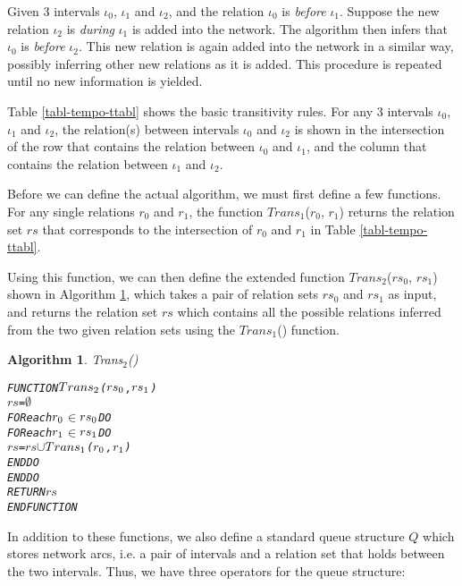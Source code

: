 \documentclass[11pt]{report}
\newenvironment{vverbatim}
{
  \begin{alltt}
}
{
    \vspace{-\baselineskip}
  \end{alltt}
}
\newtheorem{vvalgorithm}{Algorithm}[chapter]
\newenvironment{valgorithm}[2]
{
  \begin{vvalgorithm}{#1}
    \label{#2}
    \small
    \begin{vverbatim}
}
{
    \end{vverbatim}
  \end{vvalgorithm}
}
\begin{document}
          Given 3 intervals $\iota_0$, $\iota_1$ and $\iota_2$, and the
          relation $\iota_0$ is {\em before} $\iota_1$. Suppose the new
          relation $\iota_2$ is {\em during} $\iota_1$ is added into the
          network. The algorithm then infers that $\iota_0$ is {\em before}
          $\iota_2$. This new relation is again added into the network in a
          similar way, possibly inferring other new relations as it is added.
          This procedure is repeated until no new information is yielded.

          Table \ref{tabl-tempo-ttabl} shows the basic transitivity rules. For
          any 3 intervals $\iota_0$, $\iota_1$ and $\iota_2$, the relation(s)
          between intervals $\iota_0$ and $\iota_2$ is shown in the
          intersection of the row that contains the relation between $\iota_0$
          and $\iota_1$, and the column that contains the relation between
          $\iota_1$ and $\iota_2$.

          Before we can define the actual algorithm, we must first define a few
          functions. For any single relations $r_0$ and $r_1$, the function
          $Trans_1$($r_0$, $r_1$) returns the relation set $rs$ that
          corresponds to the intersection of $r_0$ and $r_1$ in Table
          \ref{tabl-tempo-ttabl}.

          Using this function, we can then define the extended function
          $Trans_2$($rs_0$, $rs_1$) shown in Algorithm \ref{algo-tempo-trns2},
          which takes a pair of relation sets $rs_0$ and $rs_1$ as input, and
          returns the relation set $rs$ which contains all the possible
          relations inferred from the two given relation sets using the
          $Trans_1$() function.

          \begin{valgorithm}{Trans$_2$()}{algo-tempo-trns2}
FUNCTION \(Trans\sb{2}\)(\(rs\sb{0}\), \(rs\sb{1}\))
  \(rs\) = \(\emptyset\)
  FOR each \(r\sb{0}\) \(\in\) \(rs\sb{0}\) DO
    FOR each \(r\sb{1}\) \(\in\) \(rs\sb{1}\) DO
      \(rs\) = \(rs\) \(\cup\) \(Trans\sb{1}\)(\(r\sb{0}\), \(r\sb{1}\))
    ENDDO
  ENDDO
  RETURN \(rs\)
ENDFUNCTION
          \end{valgorithm}

          In addition to these functions, we also define a standard queue
          structure $Q$ which stores network arcs, i.e. a pair of intervals
          and a relation set that holds between the two intervals. Thus, we
          have three operators for the queue structure:
\end{document}
